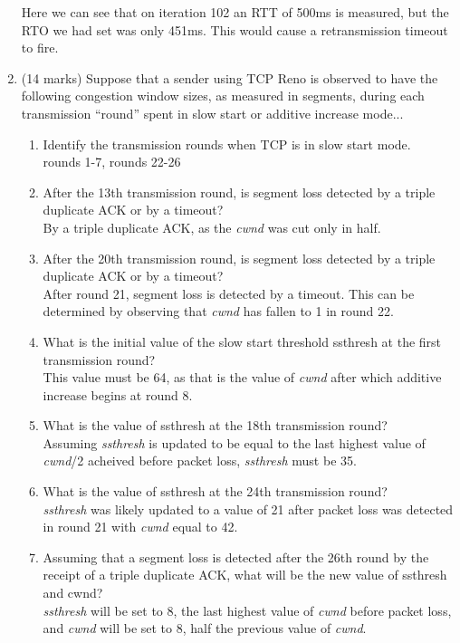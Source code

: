 \documentclass[10pt]{amsart}
\begin{document}
\begin{enumerate}
    Here we can see that on iteration 102 an RTT of 500ms is measured, but the
    RTO we had set was only 451ms.  This would cause a retransmission timeout to
    fire.

    \item (14 marks) Suppose that a sender using TCP Reno is observed to have
        the following congestion window sizes, as measured in segments, during
        each transmission “round” spent in slow start or additive increase
        mode...

        \begin{enumerate}
            \item Identify the transmission rounds when TCP is in slow start
                mode.\\
                rounds 1-7, rounds 22-26
            \item After the 13th transmission round, is segment loss detected by
                a triple duplicate ACK or by a timeout?\\
                By a triple duplicate ACK, as the \textit{cwnd} was cut only in
                half.
            \item After the 20th transmission round, is segment loss detected by
                a triple duplicate ACK or by a timeout?\\
                After round 21, segment loss is detected by a timeout.  This can
                be determined by observing that \textit{cwnd} has fallen to 1 in
                round 22.
            \item What is the initial value of the slow start threshold ssthresh
                at the first transmission round?\\
                This value must be 64, as that is the value of \textit{cwnd}
                after which additive increase begins at round 8.
            \item What is the value of ssthresh at the 18th transmission
                round?\\
                Assuming \textit{ssthresh} is updated to be equal to the last
                highest value of \textit{cwnd}/2 acheived before packet loss,
                \textit{ssthresh} must be 35.
            \item What is the value of ssthresh at the 24th transmission
                round?\\
                \textit{ssthresh} was likely updated to a value of 21 after
                packet loss was detected in round 21 with \textit{cwnd} equal to
                42.
            \item Assuming that a segment loss is detected after the 26th round
                by the receipt of a triple duplicate ACK, what will be the new
                value of ssthresh and cwnd?\\
                \textit{ssthresh} will be set to 8, the last highest value of
                \textit{cwnd} before packet loss, and \textit{cwnd} will be set
                to 8, half the previous value of \textit{cwnd}.
        \end{enumerate}
    \end{enumerate}
\end{document}

